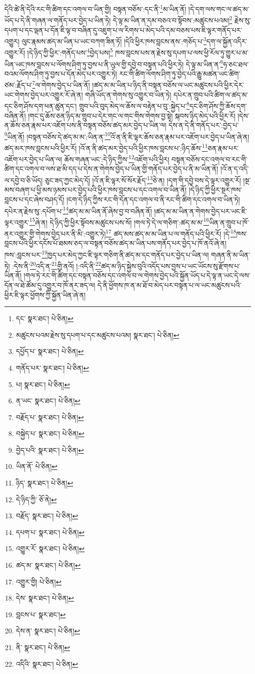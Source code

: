 དེའི་ཚེ་ནི་དེའི་རང་གི་ཚིག་དང་འགལ་བ་ཡིན་གྱི། བསྟན་བཅོས་:དང་ནི་\footnote{དང་  སྣར་ཐང་།  པེ་ཅིན། }མ་ཡིན་ནོ། །དེ་དག་ལས་གང་ལ་ཚད་མ་ཡོད་པ་དེ་ནི་གཞན་ལ་གནོད་པར་བྱེད་པ་ཡིན་ཏེ། དེ་ལྟ་མ་ཡིན་ན་དམ་བཅའ་བ་སྟོབས་:མཚུངས་པའམ།\footnote{མཚུངས་པའམ་རྗེས་སུ་དཔག་པ་དང་མཚུངས་པའམ།  སྣར་ཐང་།  པེ་ཅིན། } རྗེས་སུ་དཔག་པ་དང་ལྡན་པ་དོན་ཇི་ལྟ་བ་བཞིན་དུ་འཇུག་པ་ལ་རིགས་པ་མེད་པའི་དམ་བཅས་པས་ཇི་ལྟར་གནོད་པར་འགྱུར། ལུང་རྣམས་ཚད་མ་ཡིན་པ་ཡང་བཀག་ཟིན་ཏོ། །དེའི་ཕྱིར་ཁས་བླངས་ནས་:གཅོད་པ་\footnote{དཔྱོད་པ་  སྣར་ཐང་།  པེ་ཅིན། }དག་ལ་སྐྱོན་འདིར་འགྱུར་རོ། །དེ་ཉིད་ཀྱི་ཕྱིར་:གནོད་པས་\footnote{གནོད་པར་  སྣར་ཐང་།  པེ་ཅིན། }བྱེད་པས།\footnote{པ།  སྣར་ཐང་།  པེ་ཅིན། } ཁས་བླངས་པས་ན་རྗེས་སུ་དཔག་པ་ལས་ཕྱི་རོལ་ཏུ་གྱུར་པ་མ་ཡིན་ཡང་ཁས་བླངས་པ་ལོགས་ཤིག་ཏུ་བྱས་པ་ནི་ཡུལ་གྱི་དབྱེ་བ་བསྟན་པའི་ཕྱིར་ཏེ། དེ་ལྟ་མ་ཡིན་ན་\footnote{ན་ཡང་  སྣར་ཐང་།  པེ་ཅིན། }ཧ་ཅང་ཐལ་བའམ་ལོགས་ཤིག་ཏུ་བྱས་པ་དོན་མེད་པར་འགྱུར་ཏེ། རང་གི་ཚིག་ལོགས་ཤིག་ཏུ་བྱེད་པའི་རྒྱུ་མཚན་ཡང་ཚིག་ཙམ་:རྗོད་པ་\footnote{བརྗོད་པ་  སྣར་ཐང་།  པེ་ཅིན། }ལ་གེགས་བྱེད་པ་ཡིན་ནོ། །ཚད་མ་མ་ཡིན་པ་ཉིད་ནི་བསྟན་བཅོས་ལ་ཡང་མཚུངས་པའི་ཕྱིར་དེར་ཡང་གེགས་བྱེད་པར་འགྱུར་རོ་ཞེ་ན། གཞི་ཡོད་ན་གེགས་སུ་འགྱུར་བ་ཡིན་ཏེ། དཔེར་ན་གྲུབ་པའི་ཚིག་ལ་ཚད་མ་དང་ཅིག་ཤོས་དག་ཕན་ཚུན་དང་། གྲུབ་པའི་བུད་མེད་ལ་ཆོས་ལ་བརྟེན་པ་བུ་:སྐྱེད་པ་\footnote{བསྐྱེད་པ་  སྣར་ཐང་།  པེ་ཅིན། }དང་ཅིག་ཤོས་ཀྱི་ཆོས་དག་བཞིན་ནོ། །གང་དུ་ཆོས་ཅན་ཉིད་མ་གྲུབ་པ་དེར་གང་ལ་གང་གིས་གེགས་བྱ་སྟེ། སྐབས་ཉིད་མེད་པའི་ཕྱིར་རོ། །དེས་ན་ཆོས་ཅན་རྣམ་པར་འཇོག་པས་ནི་བསྟན་བཅོས་ཚད་མར་བྱེད་པ་ཡིན་ལ། དེས་ན་དེ་ནི་གནོད་པར་:བྱེད་པ་\footnote{བྱེད་པའི་  སྣར་ཐང་།  པེ་ཅིན། }ཡིན་ནོ། །བསྟན་བཅོས་དེ་ཚད་མ་མ་:ཡིན་ན་\footnote{ཡིན་ནོ་  པེ་ཅིན། }འོ་ན་ནི་ཇི་ལྟར་ཆོས་ཅན་རྣམ་པར་འཇོག་པར་བྱེད་པ་ཡིན་ཞེ་ན། ཚད་མར་ཁས་བླངས་པའི་ཕྱིར་རོ། །འོ་ན་ནི་ཚད་མར་བྱེད་པའི་ཕྱིར་ཁས་བླངས་པ་:ཉིད་ཆོས་\footnote{ཉིད་  སྣར་ཐང་།  པེ་ཅིན། }ཅན་རྣམ་པར་འཇོག་པར་བྱེད་པ་ཡིན་ལ། ཆོས་གཞན་ཡང་:དེ་ཉིད་ཀྱིས་\footnote{དེ་ཉིད་ཀྱི་  ཅོ་ནེ། }འཇོག་པའི་ཕྱིར། བསྟན་བཅོས་དང་འགལ་བ་རང་གི་ཚིག་དང་འགལ་བ་ལས་ཐ་མི་དད་པ་དེས་ན་གེགས་བྱེད་པ་ཡིན་གྱི་གནོད་པར་བྱེད་པ་ནི་མ་ཡིན་ནོ། །འོ་ན་ད་འདི་ལ་དབྱེ་བ་ཅི་ཡོད། ཅུང་ཟད་ཀྱང་མེད་དོ། །འོ་ན་ཇི་ལྟར་སོ་སོར་རྗོད་\footnote{བརྗོད་  སྣར་ཐང་།  པེ་ཅིན། }ཅེ་ན། །དག་གི་དབྱེ་བས་དེ་ལྟར་འགྱུར་རོ། །སྔ་མས་བཞག་པ་ཕྱི་མས་ཉམས་པར་བྱེད་པའི་ཕྱིར་ཁས་བླངས་པ་དང་འགལ་བ་ཡིན་ནོ། །དེ་ཉིད་ཀྱི་ཕྱིར་སྔར་ཁས་བླངས་པ་དང་ཞེས་བཤད་དོ། །ངག་དེ་ཉིད་ཀྱིས་རང་གི་དོན་དང་འགལ་བ་ནི་རང་གི་ཚིག་དང་འགལ་བ་ཡིན་ཏེ། དཔེར་ན་རྗེས་སུ་:དཔོག་པ་\footnote{དཔག་པ་  སྣར་ཐང་།  པེ་ཅིན། }ཚད་མ་མ་ཡིན་ནོ་ཞེས་བྱ་བ་བཞིན་ནོ། །ཚད་མ་མ་ཡིན་ན་གེགས་བྱེད་པར་ཡང་ཇི་ལྟར་འགྱུར་\footnote{འགྱུར་རོ་  སྣར་ཐང་།  པེ་ཅིན། }ཞེ་ན། དེ་ཉིད་ཀྱི་ཕྱིར་སྟོབས་མཚུངས་པས་སོ། །གལ་ཏེ་དེ་ལ་གཅིག་:ཚད་མ་མ་\footnote{ཚད་མ་  སྣར་ཐང་།  པེ་ཅིན། }ཡིན་ན་གྲུབ་པ་ཁོ་ནར་འགྱུར་གྱི་གེགས་བྱེད་པར་ནི་མི་:འགྱུར་ཏེ།\footnote{འགྱུར་གྱི།  པེ་ཅིན། } ཚད་མས་ཚད་མ་མ་ཡིན་པ་ལ་གནོད་པའི་ཕྱིར་རོ། །དེ་\footnote{དེས་  སྣར་ཐང་།  པེ་ཅིན། }ཁས་བླངས་པའི་ཕྱིར་དངོས་པོ་ཐམས་ཅད་ལ་བསྟན་བཅོས་ཚད་མ་ཡིན་པས་གནོད་པར་བྱེད་པ་ཁོ་ནའོ་ཞེ་ན། ཁས་:བླངས་པར་\footnote{བླངས་པ་  སྣར་ཐང་། }ཁྱད་པར་མེད་ཀྱང་ཇི་ལྟར་གཅིག་ནི་ཚད་མ་དང་གནོད་པར་བྱེད་པ་ཡིན་ལ། གཞན་ནི་མ་ཡིན་ཏེ། :དེས་ནི་\footnote{དེས་ན་  སྣར་ཐང་།  པེ་ཅིན། }འདི་ན་\footnote{ནི་  སྣར་ཐང་།  པེ་ཅིན། }གྱི་ནའོ། །:འདི་ནི་\footnote{འདིའི་  སྣར་ཐང་།  པེ་ཅིན། }ཚད་མ་ཉིད་སྐྱེས་བུའི་འདོད་པས་བྱས་པ་ཡང་ཡོངས་སུ་རྫོགས་པ་ཡིན་ནོ། །གལ་ཏེ་རང་གི་ཚིག་དང་བསྟན་བཅོས་དང་འགལ་བ་ལ་གེགས་བྱེད་པའི་སྐྱོན་ཡོད་པ་དེ་ལྟ་ན་ཡང་དེ་ལས་དོན་ལ་ཐེ་ཚོམ་དུ་འགྱུར་བ་ཁོ་ནར་ཟད་ལ། དེ་ནི་ཕྱོགས་ཁ་ན་མ་ཐོ་བ་མེད་པར་བསྟན་པ་ལ་ཡང་མཚུངས་པའི་ཕྱིར་ཇི་ལྟར་ཕྱོགས་ཀྱི་སྐྱོན་ཡིན་ཞེ་ན། 